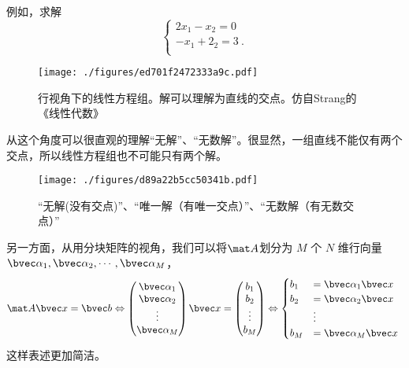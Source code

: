 \begin{example}{}
例如，求解
$$
\begin{cases}
2x_1-x_2=0 \\
-x_1+2_2=3~. \\
\end{cases}
$$
\begin{figure}[ht]
\centering
\texttt{[image: ./figures/ed701f2472333a9c.pdf]}
\caption{行视角下的线性方程组。解可以理解为直线的交点。仿自Strang的《线性代数》} \label{fig_LinEq_2}
\end{figure}
\end{example}
从这个角度可以很直观的理解“无解”、“无数解”。很显然，一组直线不能仅有两个交点，所以线性方程组也不可能只有两个解。
\begin{figure}[ht]
\centering
\texttt{[image: ./figures/d89a22b5cc50341b.pdf]}
\caption{“无解(没有交点)”、“唯一解（有唯一交点）”、“无数解（有无数交点）”} \label{fig_LinEq_3}
\end{figure}

另一方面，从用分块矩阵的视角，我们可以将$\mat A$划分为 $M$ 个 $N$ 维行向量$\bvec \alpha_1, \bvec \alpha_2, \cdots, \bvec \alpha_M$，
$$
\mat A \bvec x=\bvec b \Leftrightarrow 
\begin{pmatrix}
\bvec \alpha_1 \\
\bvec \alpha_2 \\
\vdots \\
\bvec \alpha_M
\end{pmatrix}
\bvec x
=
\begin{pmatrix}
b_1 \\
b_2 \\
\vdots \\
b_M
\end{pmatrix}
\Leftrightarrow 
\begin{cases}
b_1 &= \bvec \alpha_1 \bvec x \\
b_2 &= \bvec \alpha_2 \bvec x \\
&\vdots \\
b_M &= \bvec \alpha_M \bvec x
\end{cases}~
$$
这样表述更加简洁。

